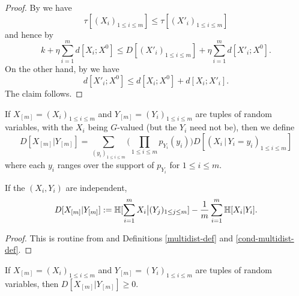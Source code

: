 \begin{proof}\leanok
  By  we have
  $$ \tau[ (X_i)_{1 \leq i \leq m}] \leq \tau[ (X'_i)_{1 \leq i \leq m}]$$
  and hence by 
  $$ k + \eta \sum_{i=1}^m d[X_i; X^0] \leq D[(X'_i)_{1 \leq i \leq m}] + \eta \sum_{i=1}^m d[X'_i; X^0].$$
  On the other hand, by  we have
  $$ d[X'_i; X^0] \leq d[X_i; X^0] + d[X_i; X'_i].$$
  The claim follows.
\end{proof}

\begin{definition}\label{cond-multidist-def}
  \leanok If $X_{[m]} = (X_i)_{1 \leq i \leq m}$ and $Y_{[m]} = (Y_i)_{1 \leq i \leq m}$ are tuples of random variables, with the $X_i$ being $G$-valued (but the $Y_i$ need not be), then we define
  \begin{equation}\label{multi-def-cond-alt}
    D[ X_{[m]} | Y_{[m]} ] = \sum_{(y_i)_{1 \leq i \leq m}} \biggl(\prod_{1 \leq i \leq m} p_{Y_i}(y_i)\biggr) D[ (X_i \,|\, Y_i \mathop{=}y_i)_{1 \leq i \leq m}]
  \end{equation}
  where each $y_i$ ranges over the support of $p_{Y_i}$ for $1 \leq i \leq m$.
\end{definition}

\begin{lemma}\label{cond-multidist-alt}\leanok
If the $(X_i,Y_i)$ are independent,
  \begin{equation}\label{multi-def-cond}
  D[ X_{[m]} | Y_{[m]}] := \mathbb{H}[\sum_{i=1}^m X_i \big| (Y_j)_{1 \leq j \leq m} ] - \frac{1}{m} \sum_{i=1}^m \mathbb{H}[ X_i | Y_i].
    \end{equation}
\end{lemma}

\begin{proof}\leanok
  This is routine from  and Definitions \ref{multidist-def} and \ref{cond-multidist-def}.
\end{proof}

\begin{lemma}\label{cond-multidist-nonneg}\leanok If $X_{[m]} = (X_i)_{1 \leq i \leq m}$ and $Y_{[m]} = (Y_i)_{1 \leq i \leq m}$ are tuples of random variables, then $D[ X_{[m]} | Y_{[m]} ] \geq 0$.
\end{lemma}

